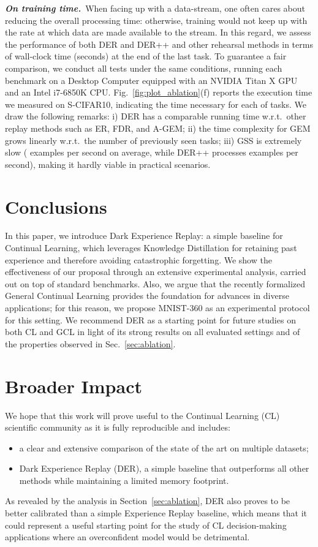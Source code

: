 \documentclass{article}
\begin{document}
\textbf{\textit{On training time.}}~When facing up with a data-stream, one often cares about reducing the overall processing time: otherwise, training would not keep up with the rate at which data are made available to the stream. In this regard, we assess the performance of both DER and DER++ and other rehearsal methods in terms of wall-clock time (seconds) at the end of the last task. To guarantee a fair comparison, we conduct all tests under the same conditions, running each benchmark on a Desktop Computer equipped with an NVIDIA Titan X GPU and an Intel i7-6850K CPU. Fig.~\ref{fig:plot_ablation}(f) reports the execution time we measured on S-CIFAR10, indicating the time necessary for each of  tasks. We draw the following remarks: i) DER has a comparable running time w.r.t.\ other replay methods such as ER, FDR, and A-GEM; ii) the time complexity for GEM grows linearly w.r.t.\ the number of previously seen tasks;  iii) GSS is extremely slow ( examples per second on average, while DER++ processes  examples per second), making it hardly viable in practical scenarios. \section{Conclusions}
In this paper, we introduce Dark Experience Replay: a simple baseline for Continual Learning, which leverages Knowledge Distillation for retaining past experience and therefore avoiding catastrophic forgetting. We show the effectiveness of our proposal through an extensive experimental analysis, carried out on top of standard benchmarks. Also, we argue that the recently formalized General Continual Learning provides the foundation for advances in diverse applications; for this reason, we propose MNIST-360 as an experimental protocol for this setting. We recommend DER as a starting point for future studies on both CL and GCL in light of its strong results on all evaluated settings and of the properties observed in Sec.~\ref{sec:ablation}. \section*{Broader Impact}

We hope that this work will prove useful to the Continual Learning (CL) scientific community as it is fully reproducible and includes:
\begin{itemize}
    \item a clear and extensive comparison of the state of the art on multiple datasets;
    \item Dark Experience Replay (DER), a simple baseline that outperforms all other methods while maintaining a limited memory footprint.
\end{itemize}
As revealed by the analysis in Section~\ref{sec:ablation}, DER also proves to be better calibrated than a simple Experience Replay baseline, which means that it could represent a useful starting point for the study of CL decision-making applications where an overconfident model would be detrimental.
\end{document}
